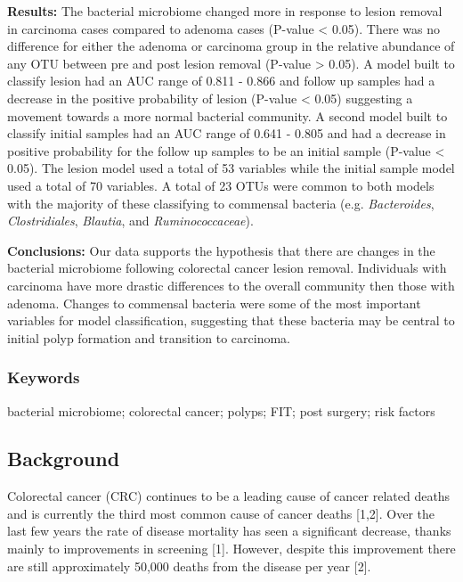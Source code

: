 \documentclass[12pt,]{article}
\begin{document}
\textbf{Results:} The bacterial microbiome changed more in response to
lesion removal in carcinoma cases compared to adenoma cases (P-value
\textless{} 0.05). There was no difference for either the adenoma or
carcinoma group in the relative abundance of any OTU between pre and
post lesion removal (P-value \textgreater{} 0.05). A model built to
classify lesion had an AUC range of 0.811 - 0.866 and follow up samples
had a decrease in the positive probability of lesion (P-value
\textless{} 0.05) suggesting a movement towards a more normal bacterial
community. A second model built to classify initial samples had an AUC
range of 0.641 - 0.805 and had a decrease in positive probability for
the follow up samples to be an initial sample (P-value \textless{}
0.05). The lesion model used a total of 53 variables while the initial
sample model used a total of 70 variables. A total of 23 OTUs were
common to both models with the majority of these classifying to
commensal bacteria (e.g. \emph{Bacteroides}, \emph{Clostridiales},
\emph{Blautia}, and \emph{Ruminococcaceae}).

\textbf{Conclusions:} Our data supports the hypothesis that there are
changes in the bacterial microbiome following colorectal cancer lesion
removal. Individuals with carcinoma have more drastic differences to the
overall community then those with adenoma. Changes to commensal bacteria
were some of the most important variables for model classification,
suggesting that these bacteria may be central to initial polyp formation
and transition to carcinoma.

\newpage

\subsubsection{Keywords}\label{keywords}

bacterial microbiome; colorectal cancer; polyps; FIT; post surgery; risk
factors

\newpage

\subsection{Background}\label{background}

Colorectal cancer (CRC) continues to be a leading cause of cancer
related deaths and is currently the third most common cause of cancer
deaths {[}1,2{]}. Over the last few years the rate of disease mortality
has seen a significant decrease, thanks mainly to improvements in
screening {[}1{]}. However, despite this improvement there are still
approximately 50,000 deaths from the disease per year {[}2{]}.
\end{document}

